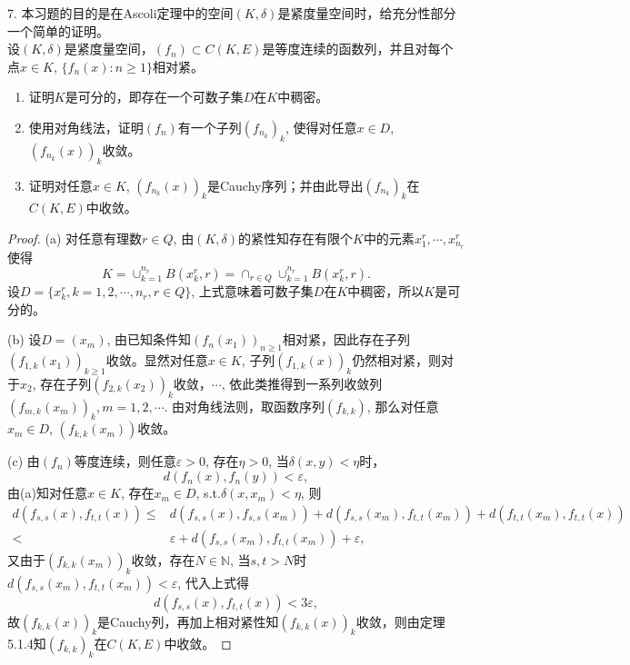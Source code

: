 \documentclass[a4paper,8pt]{ctexart}\textwidth 140mm \textheight 216mm
\newcommand{\e}{\varepsilon}
\newcommand{\8}{\infty}
\begin{document}
7. 本习题的目的是在Ascoli定理中的空间$(K,\delta)$是紧度量空间时，给充分性部分一个简单的证明。\\
设$(K,\delta)$是紧度量空间，$(f_n)\subset C(K,E)$是等度连续的函数列，并且对每个点$x\in K$, $\{f_n(x):n\geq 1\}$相对紧。
\begin{enumerate}
	\item[(a)] 证明$K$是可分的，即存在一个可数子集$D$在$K$中稠密。
	\item[(b)] 使用对角线法，证明$(f_n)$有一个子列$(f_{n_k})_k$, 使得对任意$x\in D$, $(f_{n_k}(x))_k$收敛。
	\item[(c)] 证明对任意$x\in K$, $(f_{n_k}(x))_k$是Cauchy序列；并由此导出$(f_{n_k})_k$在$C(K,E)$中收敛。
\end{enumerate}
\begin{proof}
	(a) 对任意有理数$r\in Q$, 由$(K,\delta)$的紧性知存在有限个$K$中的元素$x_1^r,\cdots,x_{n_r}^r$使得$$K=\cup_{k=1}^{n_r}B(x_k^r,r)=\cap_{r\in Q}\cup_{k=1}^{n_r}B(x_k^r,r).$$
	设$D=\{x_k^r,k=1,2,\cdots,n_r, r\in Q\}$, 上式意味着可数子集$D$在$K$中稠密，所以$K$是可分的。
	
	(b) 设$D=(x_m)$, 由已知条件知$(f_n(x_1))_{n\geq 1}$相对紧，因此存在子列$(f_{1,k}(x_1))_{k\geq 1}$收敛。显然对任意$x\in K$, 子列$(f_{1,k}(x))_k$仍然相对紧，则对于$x_2$, 存在子列$(f_{2,k}(x_2))_k$收敛，$\cdots$, 依此类推得到一系列收敛列$(f_{m,k}(x_m))_k,m=1,2,\cdots$. 由对角线法则，取函数序列$(f_{k,k})$, 那么对任意$x_m\in D$, $(f_{k,k}(x_m))$收敛。
	
	(c) 由$(f_n)$等度连续，则任意$\e>0$, 存在$\eta>0$, 当$\delta(x,y)<\eta$时，
	$$d(f_n(x),f_n(y))<\e,$$
	由(a)知对任意$x\in K$, 存在$x_m\in D$, s.t.$\delta(x,x_m)<\eta$, 则
	\begin{equation*}
	\begin{split}
	d(f_{s,s}(x),f_{t,t}(x))\leq & d(f_{s,s}(x),f_{s,s}(x_m))+d(f_{s,s}(x_m),f_{t,t}(x_m))+d(f_{t,t}(x_m),f_{t,t}(x))\\
	<&\e+d(f_{s,s}(x_m),f_{t,t}(x_m))+\e,
	\end{split}
	\end{equation*} 
	又由于$(f_{k,k}(x_m))_k$收敛，存在$N\in\mathbb{N}$, 当$s,t> N$时$d(f_{s,s}(x_m),f_{t,t}(x_m))<\e$, 代入上式得
	$$d(f_{s,s}(x),f_{t,t}(x))<3\e,$$
	故$(f_{k,k}(x))_k$是Cauchy列，再加上相对紧性知$(f_{k,k}(x))_k$收敛，则由定理5.1.4知$(f_{k,k})_k$在$C(K,E)$中收敛。
\end{proof}
\end{document}
